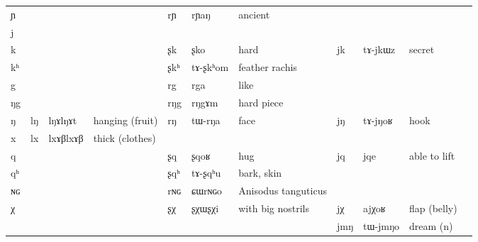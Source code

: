 \documentclass[oldfontcommands,oneside,a4paper,11pt]{article}
\newcommand{\ipa}[1]{{\phon #1}} %
\newcommand{\idph}[1]{\cellcolor{gray}\textbf{#1}}
\begin{document}
\begin{table}
{\begin{tabular}{l|lll|lll|lll|l}
\ipa{ɲ}   &	  &	  &	&	\ipa{rɲ}  &	\ipa{rɲaŋ}  &	ancient&	  &	  &	&	\\
\ipa{j}   &	  &	  &	&	  &	  &	&	  &	  &	&	\\
\ipa{k}   &	  &	  &	&	\ipa{ʂk}  &	\ipa{ʂko}  &	hard&	\ipa{jk}  &	\ipa{tɤ-jkɯz}  &secret	&	\\
\ipa{kʰ}   &	  &	  &	&	\ipa{ʂkʰ}  &	\ipa{tɤ-ʂkʰom}  &	feather rachis&	   &	  &	&	\\
\ipa{g}   &	  &	  &	&	\ipa{rg}  &	\ipa{rga}  &	like&	  &	  &	&	\\
\ipa{ŋg}   &	  &	  &	&	\ipa{rŋg}  &	\ipa{rŋgɤm}  &hard piece	&	   &	   &	&	\\
\ipa{ŋ}   &	\ipa{lŋ}  \idph{} &	\ipa{lŋɤlŋɤt}  &hanging (fruit)	&	\ipa{rŋ}  &	\ipa{tɯ-rŋa}  &	face&	\ipa{jŋ}  &	\ipa{tɤ-jŋoʁ}  &	hook&	\\
\ipa{x}   &	\ipa{lx}  \idph{} &	\ipa{lxɤβlxɤβ}  &thick (clothes)	&	  &	  &	&	  &	  &	&	\\
\ipa{q}   &	  &	  &	&	\ipa{ʂq}  &	\ipa{ʂqoʁ}  &hug	&	\ipa{jq}  &	\ipa{jqe}  &	able to lift&	\\
\ipa{qʰ}   &	  &	  &	&	\ipa{ʂqʰ}  &	\ipa{tɤ-ʂqʰu}  &bark, skin&	   &	   &	&	\\
\ipa{ɴɢ}   &	  &	  &	&	\ipa{rɴɢ}  &	\ipa{ɕɯrɴɢo}  &Anisodus tanguticus 	&	  &	  &	&	\\
\ipa{χ}   &	  &	  &	&	\ipa{ʂχ}   &	\ipa{ʂχɯʂχi}  &with big nostrils	&	\ipa{jχ}  &	\ipa{ajχoʁ}  &	flap (belly)&	\\
\midrule
&&&&&&&\ipa{jmŋ} & \ipa{tɯ-jmŋo} &dream (n)\\
\bottomrule
\end{tabular}}
\end{table}
 
\end{document}
